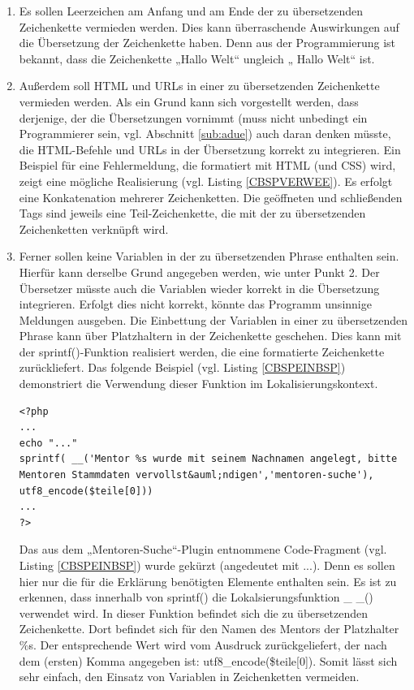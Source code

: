 \begin{enumerate}
	\item Es sollen Leerzeichen am Anfang und am Ende der zu übersetzenden Zeichenkette vermieden werden. Dies kann überraschende Auswirkungen auf die Übersetzung der Zeichenkette haben. Denn aus der Programmierung ist bekannt, dass die Zeichenkette „Hallo Welt“ ungleich „ Hallo Welt“ ist.
	\item Außerdem soll HTML und URLs in einer zu übersetzenden Zeichenkette vermieden werden. Als ein Grund kann sich vorgestellt werden, dass derjenige, der die Übersetzungen vornimmt (muss nicht unbedingt ein Programmierer sein, vgl. Abschnitt \ref{sub:adue}) auch daran denken müsste, die HTML-Befehle und URLs in der Übersetzung korrekt zu integrieren. \newline Ein Beispiel für eine Fehlermeldung, die formatiert mit HTML (und CSS) wird, zeigt eine mögliche Realisierung (vgl. Listing \ref{CBSPVERWEE}). Es erfolgt eine Konkatenation mehrerer Zeichenketten. Die geöffneten und schließenden Tags sind jeweils eine Teil-Zeichenkette, die mit der zu übersetzenden Zeichenketten verknüpft wird. 
\item Ferner sollen keine Variablen in der zu übersetzenden Phrase enthalten sein. Hierfür kann derselbe Grund angegeben werden, wie unter Punkt 2. Der Übersetzer müsste auch die Variablen wieder korrekt in die Übersetzung integrieren. Erfolgt dies nicht korrekt, könnte das Programm unsinnige Meldungen ausgeben.\newline
Die Einbettung der Variablen in einer zu übersetzenden Phrase kann über Platzhaltern in der Zeichenkette geschehen. Dies kann mit der sprintf()-Funktion realisiert werden, die eine formatierte Zeichenkette zurückliefert.\newline
Das folgende Beispiel (vgl. Listing \ref{CBSPEINBSP}) demonstriert die Verwendung dieser Funktion im Lokalisierungskontext.
\begin{lstlisting}
<?php 
...
echo "..."
sprintf( __('Mentor %s wurde mit seinem Nachnamen angelegt, bitte Mentoren Stammdaten vervollst&auml;ndigen','mentoren-suche'), utf8_encode($teile[0]))	
...
?> 
\end{lstlisting}	
Das aus dem „Mentoren-Suche“-Plugin entnommene Code-Fragment (vgl. Listing \ref{CBSPEINBSP}) wurde gekürzt (angedeutet mit ...). Denn es sollen hier nur die für die Erklärung benötigten Elemente enthalten sein.
Es ist zu erkennen, dass innerhalb von sprintf() die Lokalsierungsfunktion \_ \_() verwendet wird. In dieser Funktion befindet sich die zu übersetzenden Zeichenkette. Dort befindet sich für den Namen des Mentors der Platzhalter \%s. Der entsprechende Wert wird vom Ausdruck  zurückgeliefert, der nach dem (ersten) Komma angegeben ist: utf8\_encode(\$teile[0]).
Somit lässt sich sehr einfach, den Einsatz von Variablen in Zeichenketten vermeiden.\end{enumerate}
